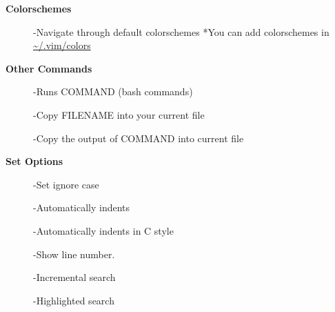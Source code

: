 \documentclass{article}
\begin{document}
\begin{multicols}{3}
\begin{center}
\Large\textbf{Colorschemes}
\end{center}
\begin{description}
\item[]
-Navigate through default colorschemes
\newline
*You can add colorschemes in \url{~/.vim/colors}
\\
\end{description}
\begin{center}
\Large\textbf{Other Commands}
\end{center}
\begin{description}
\item[]
-Runs COMMAND (bash commands)
\item[] 
-Copy FILENAME into your current file
\item[]
-Copy the output of COMMAND into current file
\end{description}

\begin{center}
\Large\textbf{Set Options}
\end{center}
\begin{description}
\item[]
-Set ignore case
\item[]
-Automatically indents
\item[] 
-Automatically indents in C style
\item[] 
-Show line number.
\item[]
-Incremental search
\item[] 
-Highlighted search
\end{description}
\end{multicols}
\end{document}
